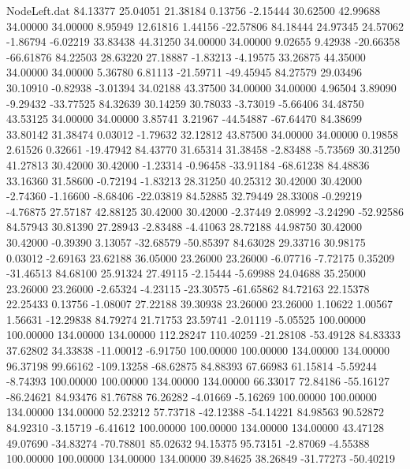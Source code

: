 \begin{filecontents}{NodeLeft.dat}
  84.13377   25.04051   21.38184     0.13756   -2.15444   30.62500   42.99688   34.00000   34.00000    8.95949   12.61816    1.44156  -22.57806
  84.18444   24.97345   24.57062    -1.86794   -6.02219   33.83438   44.31250   34.00000   34.00000    9.02655    9.42938  -20.66358  -66.61876
  84.22503   28.63220   27.18887    -1.83213   -4.19575   33.26875   44.35000   34.00000   34.00000    5.36780    6.81113  -21.59711  -49.45945
  84.27579   29.03496   30.10910    -0.82938   -3.01394   34.02188   43.37500   34.00000   34.00000    4.96504    3.89090   -9.29432  -33.77525
  84.32639   30.14259   30.78033    -3.73019   -5.66406   34.48750   43.53125   34.00000   34.00000    3.85741    3.21967  -44.54887  -67.64470
  84.38699   33.80142   31.38474     0.03012   -1.79632   32.12812   43.87500   34.00000   34.00000    0.19858    2.61526    0.32661  -19.47942
  84.43770   31.65314   31.38458    -2.83488   -5.73569   30.31250   41.27813   30.42000   30.42000   -1.23314   -0.96458  -33.91184  -68.61238
  84.48836   33.16360   31.58600    -0.72194   -1.83213   28.31250   40.25312   30.42000   30.42000   -2.74360   -1.16600   -8.68406  -22.03819
  84.52885   32.79449   28.33008    -0.29219   -4.76875   27.57187   42.88125   30.42000   30.42000   -2.37449    2.08992   -3.24290  -52.92586
  84.57943   30.81390   27.28943    -2.83488   -4.41063   28.72188   44.98750   30.42000   30.42000   -0.39390    3.13057  -32.68579  -50.85397
  84.63028   29.33716   30.98175     0.03012   -2.69163   23.62188   36.05000   23.26000   23.26000   -6.07716   -7.72175    0.35209  -31.46513
  84.68100   25.91324   27.49115    -2.15444   -5.69988   24.04688   35.25000   23.26000   23.26000   -2.65324   -4.23115  -23.30575  -61.65862
  84.72163   22.15378   22.25433     0.13756   -1.08007   27.22188   39.30938   23.26000   23.26000    1.10622    1.00567    1.56631  -12.29838
  84.79274   21.71753   23.59741    -2.01119   -5.05525  100.00000  100.00000  134.00000  134.00000  112.28247  110.40259  -21.28108  -53.49128
  84.83333   37.62802   34.33838   -11.00012   -6.91750  100.00000  100.00000  134.00000  134.00000   96.37198   99.66162 -109.13258  -68.62875
  84.88393   67.66983   61.15814    -5.59244   -8.74393  100.00000  100.00000  134.00000  134.00000   66.33017   72.84186  -55.16127  -86.24621
  84.93476   81.76788   76.26282    -4.01669   -5.16269  100.00000  100.00000  134.00000  134.00000   52.23212   57.73718  -42.12388  -54.14221
  84.98563   90.52872   84.92310    -3.15719   -6.41612  100.00000  100.00000  134.00000  134.00000   43.47128   49.07690  -34.83274  -70.78801
  85.02632   94.15375   95.73151    -2.87069   -4.55388  100.00000  100.00000  134.00000  134.00000   39.84625   38.26849  -31.77273  -50.40219

\end{filecontents}
